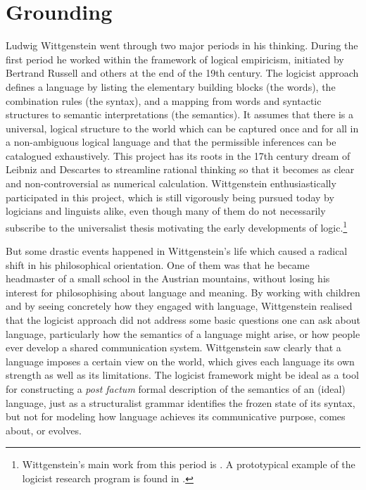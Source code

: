 \chapter{Grounding} \label{chap:7}

Ludwig Wittgenstein went through two major 
periods in his thinking. During the first period he worked
within the framework of logical empiricism, initiated by 
Bertrand Russell and others at the end of the 19th century. 
The logicist approach defines a language by listing the 
elementary building blocks (the words), the combination 
rules (the syntax), and a mapping from words and 
syntactic structures to semantic interpretations (the semantics).  
It assumes that there is a universal, logical structure to the
world which can be captured once and for all in a
non-ambiguous logical language 
and that the permissible inferences can be catalogued 
exhaustively. This project has its roots in the 
17th century dream of
Leibniz and Descartes to streamline rational thinking
so that it becomes as clear and non-controversial as
numerical calculation. 
Wittgenstein enthusiastically participated in this project, 
which is still vigorously being pursued today by logicians 
and linguists alike, even though many of them do not necessarily subscribe
to the universalist thesis motivating the early developments of 
logic.\footnote{Wittgenstein's main work from this period is \cite{Wittgenstein:1922}. 
A prototypical example of the logicist research program 
is found in \cite{Carnap:1928}.}

But some drastic events happened in Wittgenstein's life which 
caused a radical shift in his philosophical orientation. 
One of them was that he became headmaster of a small
school in the Austrian mountains,
without losing his interest for philosophising about language and 
meaning. By working with children and by seeing concretely
how they engaged with language, Wittgenstein realised that the 
logicist approach did not address some basic questions one 
can ask about language, particularly how the semantics of a 
language might arise, or how people ever develop a shared 
communication system. Wittgenstein
saw clearly that a language imposes a certain view on the 
world, which gives each language its own strength as well as
its limitations. The logicist 
framework might be ideal as a tool for constructing a 
{\itshape post factum} formal description of the semantics of
an (ideal) language, just as a structuralist grammar identifies
the frozen state of its syntax, but
not for modeling how language achieves its communicative purpose, 
comes about, or evolves. 

